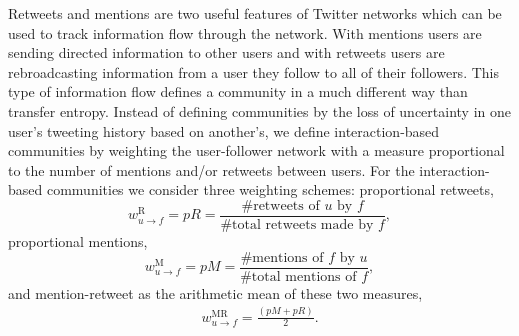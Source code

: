 Retweets and mentions are two useful features of Twitter networks which can be used to track information flow through the network.
With mentions users are sending directed information to other users and with retweets users are rebroadcasting information from a user they follow to all of their followers. 
This type of information flow defines a community in a much different way than transfer entropy. Instead of defining communities by the loss of uncertainty in one user's tweeting history based on another's, we define interaction-based communities by weighting the user-follower network with a measure proportional to the number of mentions and/or retweets between users. 
For the interaction-based communities we consider three weighting schemes: proportional retweets,
\begin{equation}
w_{u \to f}^{\text{R}}=pR=\frac{\mbox{\# retweets of }u \mbox{ by }f}{\mbox{\# total retweets made by }f},
\end{equation}
proportional mentions,
\begin{equation}
w_{u \to f}^{\text{M}} = pM = \frac{\mbox{\# mentions of }f \mbox{ by }u}{\mbox{\# total mentions of }f},
\end{equation}
and mention-retweet as the arithmetic mean of these two measures,
\begin{align}
	w_{u \to f}^{\text{MR}} = \frac{(pM+pR)}{2}. \label{Eqn-EW-interaction}
\end{align} 


